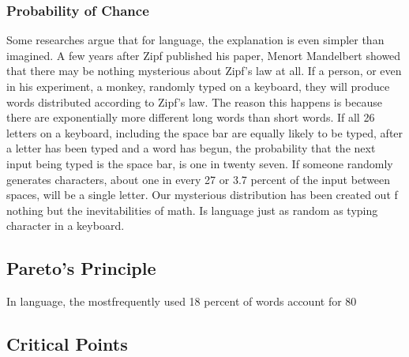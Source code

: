 \documentclass[a4paper,10pt]{article}
\begin{document}
\subsubsection{Probability of Chance}

Some researches argue that for language, the explanation is even simpler than imagined. A few years after Zipf published his paper, Menort Mandelbert showed that there may be nothing mysterious about Zipf's law at all. If a person, or even in his experiment, a monkey, randomly typed on a keyboard, they will produce words distributed according to Zipf's law. The reason this happens is because there are exponentially more different long words than short words. If all 26 letters on a keyboard, including the space bar are equally likely to be typed, after a letter has been typed and a word has begun, the probability that the next input being typed is the space bar, is one in twenty seven.  If someone randomly generates  characters, about one in every 27 or 3.7 percent of the input between spaces, will be a single letter. Our mysterious distribution has been created out f nothing but the inevitabilities of math. Is language just as random as typing character in a keyboard.

\subsection{Pareto's Principle}
 In language, the mostfrequently used 18 percent of words account for 80%

\subsection{Critical Points}
\end{document}
